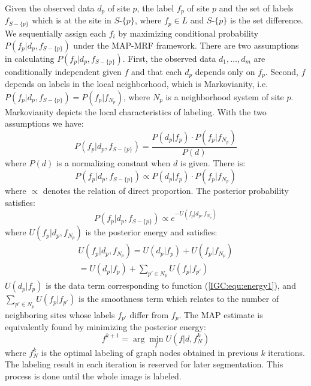 Given the observed data $d_p$ of site $p$, the label $f_p$  of site $p$ and the set of labels $f_{S-\{p\}}$ which is at the site in $S$-$\{p\}$, where $f_p\in L$ and $S$-$\{p\}$ is the set difference. We sequentially assign each $f_i$ by maximizing conditional probability         $P(f_p|d_p,f_{S-\{p\}})$ under the MAP-MRF framework. There are two assumptions in calculating $P(f_p|d_p,f_{S-\{p\}})$. First, the observed data $d_1,\dots,d_m$ are conditionally independent given $f$ and that each $d_p$ depends only on $f_p$. Second, $f$ depends on labels in the local neighborhood, which is Markovianity, i.e. $P(f_p|d_p,f_{S-\{p\}})=P(f_p|f_{N_p})$, where $N_p$ is a neighborhood system of site $p$. Markovianity depicts the local characteristics
        of labeling. With the two assumptions we have:
            \begin{equation}
            P(f_p|d_p,f_{S-\{p\}})=\frac{P(d_p|f_p)\cdot P(f_p|f_{N_p})}{P(d)}
            \end{equation}
where $P(d)$ is a normalizing constant when $d$ is given. There is:
            \begin{equation}
            P(f_p|d_p,f_{S-\{p\}})\propto P(d_p|f_p)\cdot P(f_p|f_{N_p})
            \end{equation}
where $\propto$ denotes the relation of direct proportion. The posterior probability satisfies:
            \begin{equation}
            P(f_p|d_p,f_{S-\{p\}})\propto e^{-U(f_p|d_p,f_{N_p})}
            \end{equation}
where $U(f_p|d_p,f_{N_p})$ is the posterior energy and satisfies:
            \begin{eqnarray}
            U(f_p|d_p,f_{N_p})
                = U(d_p|f_p)+U(f_p|f_{N_p})\nonumber\\
                = U(d_p|f_p)+ \sum_{p'\in N_p}U(f_p|f_{p'})
            \end{eqnarray}
 $U(d_p|f_p)$ is the data term corresponding to function (\ref{IGC:equ:energy1}), and $\sum_{p'\in N_p}U(f_p|f_{p'})$ is the smoothness term which relates to the number of neighboring sites whose labels $f_{p'}$ differ from $f_p$. The MAP estimate is equivalently found by minimizing the posterior energy:
 \begin{equation}
  f^{k+1}=\arg\min_{f} U(f|d,f_{N}^{k})
 \end{equation}
where $f_N^k$ is the optimal labeling of graph nodes obtained in previous $k$ iterations. The labeling result in each iteration is reserved for later segmentation. This process is done until the whole image is labeled.

